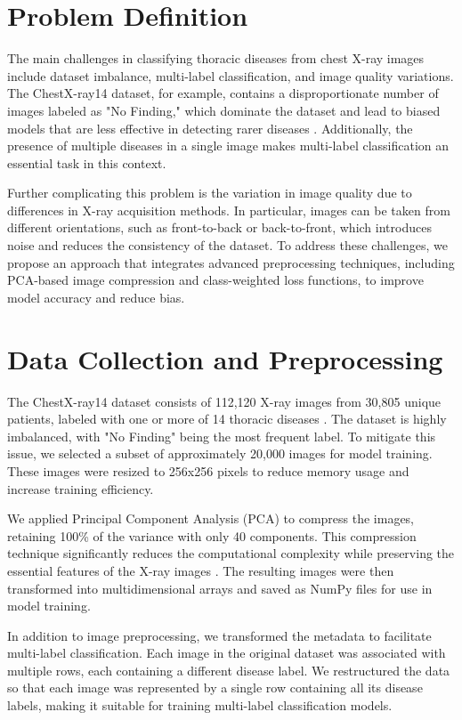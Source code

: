 \documentclass[conference]{IEEEtran}
\begin{document}
\section{Problem Definition}
The main challenges in classifying thoracic diseases from chest X-ray images include dataset imbalance, multi-label classification, and image quality variations. The ChestX-ray14 dataset, for example, contains a disproportionate number of images labeled as "No Finding," which dominate the dataset and lead to biased models that are less effective in detecting rarer diseases \cite{johnson2019survey}. Additionally, the presence of multiple diseases in a single image makes multi-label classification an essential task in this context. 

Further complicating this problem is the variation in image quality due to differences in X-ray acquisition methods. In particular, images can be taken from different orientations, such as front-to-back or back-to-front, which introduces noise and reduces the consistency of the dataset. To address these challenges, we propose an approach that integrates advanced preprocessing techniques, including PCA-based image compression and class-weighted loss functions, to improve model accuracy and reduce bias.

\section{Data Collection and Preprocessing}
The ChestX-ray14 dataset consists of 112,120 X-ray images from 30,805 unique patients, labeled with one or more of 14 thoracic diseases \cite{wang2017chestxray14}. The dataset is highly imbalanced, with "No Finding" being the most frequent label. To mitigate this issue, we selected a subset of approximately 20,000 images for model training. These images were resized to 256x256 pixels to reduce memory usage and increase training efficiency.

We applied Principal Component Analysis (PCA) to compress the images, retaining 100\% of the variance with only 40 components. This compression technique significantly reduces the computational complexity while preserving the essential features of the X-ray images \cite{turk1991eigenfaces}. The resulting images were then transformed into multidimensional arrays and saved as NumPy files for use in model training.

In addition to image preprocessing, we transformed the metadata to facilitate multi-label classification. Each image in the original dataset was associated with multiple rows, each containing a different disease label. We restructured the data so that each image was represented by a single row containing all its disease labels, making it suitable for training multi-label classification models.
\end{document}
